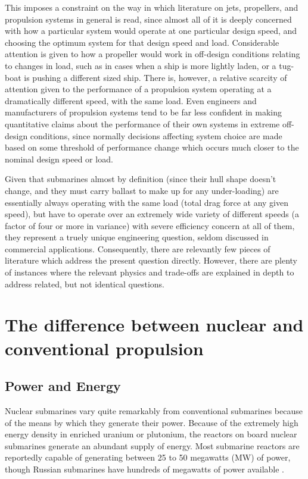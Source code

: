 \documentclass{article}\usepackage[]{graphicx}\usepackage[]{color}
\begin{document}
This imposes a constraint on the way in which literature on jets, propellers, and propulsion systems in general is read, since almost all of it is deeply concerned with how a particular system would operate at one particular design speed, and choosing the optimum system for that design speed and load.  Considerable attention is given to how a propeller would work in off-design conditions relating to changes in load, such as in cases when a ship is more lightly laden, or a tug-boat is pushing a different sized ship.  There is, however, a relative scarcity of attention given to the performance of a propulsion system operating at a dramatically different speed, with the same load. Even engineers and manufacturers of propulsion systems tend to be far less confident in making quantitative claims about the performance of their own systems in extreme off-design conditions, since normally decisions affecting system choice are made based on some threshold of performance change which occurs much closer to the nominal design speed or load.

Given that submarines almost by definition (since their hull shape doesn't change, and they must carry ballast to make up for any under-loading) are essentially always operating with the same load (total drag force at any given speed), but have to operate over an extremely wide variety of different speeds (a factor of four or more in variance) with severe efficiency concern at all of them, they represent a truely unique engineering question, seldom discussed in commercial applications.  Consequently, there are relevantly few pieces of literature which address the present question directly. However, there are plenty of instances where the relevant physics and trade-offs are explained in depth to address related, but not identical questions.

\newpage  \section{The difference between nuclear and conventional propulsion}

\subsection{Power and Energy}
Nuclear submarines vary quite remarkably from conventional submarines because of the means by which they generate their power.  Because of the extremely high energy density in enriched uranium or plutonium, the reactors on board nuclear submarines generate an abundant supply of energy.  Most submarine reactors are reportedly capable of generating between 25 to 50 megawatts (MW) of power, though Russian submarines have hundreds of megawatts of power available \parencite{WNA2017}.
\end{document}
